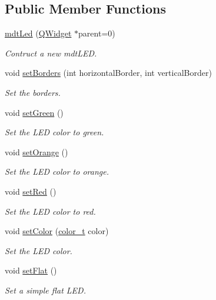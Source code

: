 \subsection*{Public Member Functions}
\begin{DoxyCompactItemize}
\item 
\hyperlink{classmdt_led_a64d5de3a8c2e4937d9ca9328b5ae4f9c}{mdt\-Led} (\hyperlink{class_q_widget}{Q\-Widget} $\ast$parent=0)
\begin{DoxyCompactList}\small\item\em Contruct a new mdt\-L\-E\-D. \end{DoxyCompactList}\item 
void \hyperlink{classmdt_led_a1271e1dfe07e8ff459d7f20e55ab3bc4}{set\-Borders} (int horizontal\-Border, int vertical\-Border)
\begin{DoxyCompactList}\small\item\em Set the borders. \end{DoxyCompactList}\item 
void \hyperlink{classmdt_led_a5f3b4975c423ac35442ec2b9c546b0e4}{set\-Green} ()
\begin{DoxyCompactList}\small\item\em Set the L\-E\-D color to green. \end{DoxyCompactList}\item 
void \hyperlink{classmdt_led_a5cdd40d1e3baefab72d9cda866353797}{set\-Orange} ()
\begin{DoxyCompactList}\small\item\em Set the L\-E\-D color to orange. \end{DoxyCompactList}\item 
void \hyperlink{classmdt_led_a28e208fb105c99b21d81d4c82ed50a98}{set\-Red} ()
\begin{DoxyCompactList}\small\item\em Set the L\-E\-D color to red. \end{DoxyCompactList}\item 
void \hyperlink{classmdt_led_a16e89edb08321c7abec736b2ebf28986}{set\-Color} (\hyperlink{classmdt_led_a2d57d9ef04d2105d2fad93b57fc7cfef}{color\-\_\-t} color)
\begin{DoxyCompactList}\small\item\em Set the L\-E\-D color. \end{DoxyCompactList}\item 
void \hyperlink{classmdt_led_a664ca4c83ec0faaa86bd3f932fb06d5b}{set\-Flat} ()
\begin{DoxyCompactList}\small\item\em Set a simple flat L\-E\-D. \end{DoxyCompactList}\item 

\end{DoxyCompactItemize}
